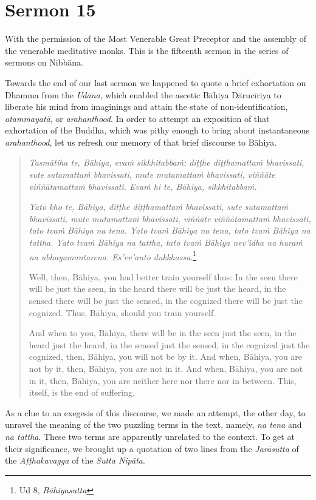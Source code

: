 \chapter{Sermon 15}

\NibbanaOpeningQuote

With the permission of the Most Venerable Great Preceptor and the assembly of the venerable meditative monks. This is the fifteenth sermon in the series of sermons on Nibbāna.

Towards the end of our last sermon we happened to quote a brief exhortation on Dhamma from the \emph{Udāna}, which enabled the ascetic Bāhiya Dārucīriya to liberate his mind from imaginings and attain the state of non-identification, \emph{atammayatā}, or \emph{arahanthood}. In order to attempt an exposition of that exhortation of the Buddha, which was pithy enough to bring about instantaneous \emph{arahanthood}, let us refresh our memory of that brief discourse to Bāhiya.

\begin{quote}
\emph{Tasmātiha te, Bāhiya, evaṁ sikkhitabbaṁ: diṭṭhe diṭṭhamattaṁ bhavissati, sute sutamattaṁ bhavissati, mute mutamattaṁ bhavissati, viññāte viññātamattaṁ bhavissati. Evaṁ hi te, Bāhiya, sikkhitabbaṁ.}

\emph{Yato kho te, Bāhiya, diṭṭhe diṭṭhamattaṁ bhavissati, sute sutamattaṁ bhavissati, mute mutamattaṁ bhavissati, viññāte viññātamattaṁ bhavissati, tato tvaṁ Bāhiya na tena. Yato tvaṁ Bāhiya na tena, tato tvaṁ Bāhiya na tattha. Yato tvaṁ Bāhiya na tattha, tato tvaṁ Bāhiya nev'idha na huraṁ na ubhayamantarena. Es'ev'anto dukkhassa}.\footnote{Ud 8, \emph{Bāhiyasutta}}

Well, then, Bāhiya, you had better train yourself thus: In the seen there will be just the seen, in the heard there will be just the heard, in the sensed there will be just the sensed, in the cognized there will be just the cognized. Thus, Bāhiya, should you train yourself.

And when to you, Bāhiya, there will be in the seen just the seen, in the heard just the heard, in the sensed just the sensed, in the cognized just the cognized, then, Bāhiya, you will not be by it. And when, Bāhiya, you are not by it, then, Bāhiya, you are not in it. And when, Bāhiya, you are not in it, then, Bāhiya, you are neither here nor there nor in between. This, itself, is the end of suffering.
\end{quote}

As a clue to an exegesis of this discourse, we made an attempt, the other day, to unravel the meaning of the two puzzling terms in the text, namely, \emph{na tena} and \emph{na tattha}. These two terms are apparently unrelated to the context. To get at their significance, we brought up a quotation of two lines from the \emph{Jarāsutta} of the \emph{Aṭṭhakavagga} of the \emph{Sutta Nipāta}.

